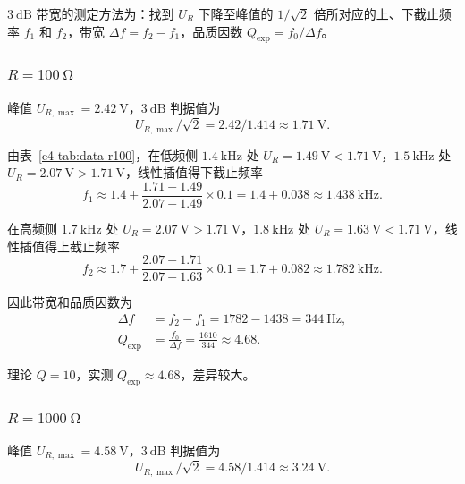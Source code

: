 \(\SI{3}{\dB}\) 带宽的测定方法为：找到 \(U_{R}\) 下降至峰值的 \(1/\sqrt{2}\) 倍所对应的上、下截止频率 \(f_{1}\) 和 \(f_{2}\)，带宽 \(\Delta f = f_{2}-f_{1}\)，品质因数 \(Q_{\exp}=f_{0}/\Delta f\)。

\subsubsection{\(R=\SI{100}{\ohm}\)}

峰值 \(U_{R,\max}=\SI{2.42}{\volt}\)，\(\SI{3}{\dB}\) 判据值为
\begin{equation}
    U_{R,\max}/\sqrt{2} = 2.42/1.414 \approx \SI{1.71}{\volt}.
\end{equation}

由表~\ref{e4-tab:data-r100}，在低频侧 \(\SI{1.4}{\kilo\hertz}\) 处 \(U_{R}=\SI{1.49}{\volt}<\SI{1.71}{\volt}\)，\(\SI{1.5}{\kilo\hertz}\) 处 \(U_{R}=\SI{2.07}{\volt}>\SI{1.71}{\volt}\)，线性插值得下截止频率
\begin{equation}
    f_{1} \approx 1.4 + \frac{1.71-1.49}{2.07-1.49}\times 0.1 = 1.4 + 0.038 \approx \SI{1.438}{\kilo\hertz}.
\end{equation}

在高频侧 \(\SI{1.7}{\kilo\hertz}\) 处 \(U_{R}=\SI{2.07}{\volt}>\SI{1.71}{\volt}\)，\(\SI{1.8}{\kilo\hertz}\) 处 \(U_{R}=\SI{1.63}{\volt}<\SI{1.71}{\volt}\)，线性插值得上截止频率
\begin{equation}
    f_{2} \approx 1.7 + \frac{2.07-1.71}{2.07-1.63}\times 0.1 = 1.7 + 0.082 \approx \SI{1.782}{\kilo\hertz}.
\end{equation}

因此带宽和品质因数为
\begin{align}
    \Delta f &= f_{2}-f_{1} = 1782-1438 = \SI{344}{\hertz}, \\
    Q_{\exp} &= \frac{f_{0}}{\Delta f} = \frac{1610}{344} \approx 4.68.
\end{align}

理论 \(Q=10\)，实测 \(Q_{\exp}\approx 4.68\)，差异较大。

\subsubsection{\(R=\SI{1000}{\ohm}\)}

峰值 \(U_{R,\max}=\SI{4.58}{\volt}\)，\(\SI{3}{\dB}\) 判据值为
\begin{equation}
    U_{R,\max}/\sqrt{2} = 4.58/1.414 \approx \SI{3.24}{\volt}.
\end{equation}

